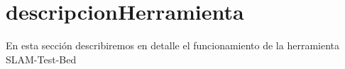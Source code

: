 \section{descripcionHerramienta} \label{s:descripcionHerramienta}
En esta sección describiremos en detalle el funcionamiento de la herramienta SLAM-Test-Bed
